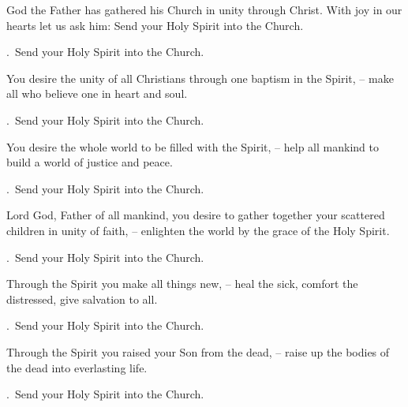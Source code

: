 \lettrine[loversize=0.15,lines=2]{G}{}od the Father has gathered his Church in unity through Christ. With joy in our hearts let us ask him: Send your Holy Spirit into the Church.
\par \Rbar.~Send your Holy Spirit into the Church.

You desire the unity of all Christians through one baptism in the Spirit,
– make all who believe one in heart and soul.
\par \Rbar.~Send your Holy Spirit into the Church.

You desire the whole world to be filled with the Spirit,
– help all mankind to build a world of justice and peace.
\par \Rbar.~Send your Holy Spirit into the Church.

Lord God, Father of all mankind, you desire to gather together your scattered children in unity of faith,
– enlighten the world by the grace of the Holy Spirit.
\par \Rbar.~Send your Holy Spirit into the Church.

Through the Spirit you make all things new,
– heal the sick, comfort the distressed, give salvation to all.
\par \Rbar.~Send your Holy Spirit into the Church.

Through the Spirit you raised your Son from the dead,
– raise up the bodies of the dead into everlasting life.
\par \Rbar.~Send your Holy Spirit into the Church.
